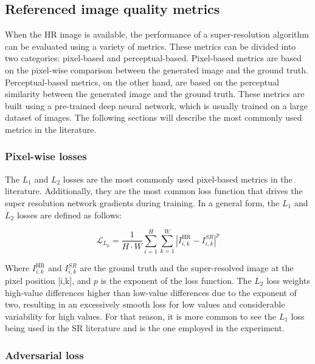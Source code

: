     \subsection{Referenced image quality metrics}

        When the HR image is available, the performance of a super-resolution algorithm can be evaluated using a variety of metrics. 
        These metrics can be divided into two categories: pixel-based and perceptual-based.
        Pixel-based metrics are based on the pixel-wise comparison between the generated image and the ground truth. 
        Perceptual-based metrics, on the other hand, are based on the perceptual similarity between the generated image and the ground truth. 
        These metrics are built using a pre-trained deep neural network, which is usually trained on a large dataset of images.
        The following sections will describe the most commonly used metrics in the literature.

        \subsubsection{Pixel-wise losses}

            The $L_1$ and $L_2$ losses are the most commonly used pixel-based metrics in the literature. 
            Additionally, they are the most common loss function that drives the super resolution network gradients during training. 
            In a general form, the $L_1$ and $L_2$ losses are defined as follows:

            \begin{equation}
                \mathcal{L}_{L_p} = \frac{1}{H \cdot W} \sum_{i=1}^{H} \sum_{k=1}^{W} |I^{\text{HR}}_{i,k} - I^{SR}_{i,k}|^p
            \end{equation}

            Where $I^{\text{HR}}_{i,k}$ and $I^{SR}_{i,k}$ are the ground truth and the super-resolved image at the pixel position [i,k], and $p$ is the exponent of the loss function. 
            The $L_2$ loss weights high-value differences higher than low-value differences due to the exponent of two, resulting in an excessively smooth loss for low values and considerable variability for high values.
            For that reason, it is more common to see the $L_1$ loss being used in the SR literature and is the one employed in the experiment.

        \subsubsection{Adversarial loss}

